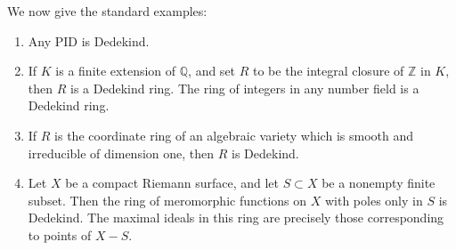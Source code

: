 We now give the standard examples:
\begin{example} 
\begin{enumerate}
\item Any PID is Dedekind.  
\item If $K$ is a finite extension of $\mathbb{Q}$, and set $R $ to be the
integral closure of $\mathbb{Z}$ in $K$, then $R$ is a Dedekind ring. The ring
of integers in any number field is a Dedekind ring. 
\item If $R$ is the coordinate ring of an algebraic variety which is smooth and
irreducible of dimension one, then $R$ is Dedekind. 
\item  Let $X$ be a compact Riemann surface, and let $S \subset X$ be a
nonempty finite subset. Then the ring of meromorphic functions on $X$ with
poles only in $S$ is
Dedekind. The maximal ideals in this ring are precisely those corresponding to
points of $X-S$. 
\end{enumerate}
\end{example} 

